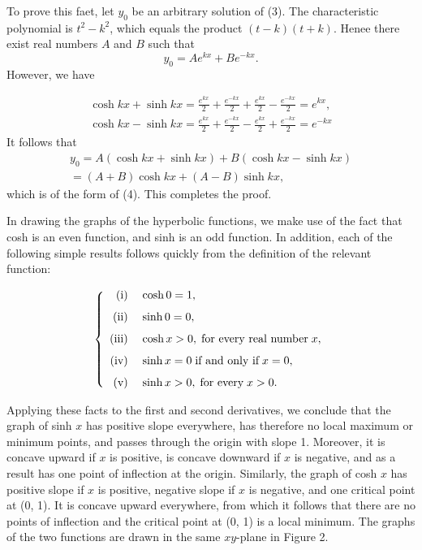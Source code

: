 To prove this faet, let $y_0$ be an arbitrary solution of (3). The characteristic polynomial is $t^2 - k^2$, which equals the product $(t - k)(t + k)$. Henee there exist real numbers $A$ and $B$ such that
$$
       y_0 = Ae^{kx} + Be^{-kx} .
$$
However, we have

\begin{eqnarray*}
       \cosh kx + \sinh kx = \frac{e^{kx}}{2} + \frac{e^{-kx}}{2} + \frac{e^{kx}}{2} - \frac{e^{-kx}}{2} = e^{kx}, \\
       \cosh kx - \sinh kx = \frac{e^{kx}}{2} + \frac{e^{-kx}}{2} - \frac{e^{kx}}{2} + \frac{e^{-kx}}{2} = e^{-kx}
\end{eqnarray*}
It follows that
\begin{eqnarray*}
       y_0 = A(\cosh kx + \sinh kx) + B(\cosh kx - \sinh kx) \\
       = (A + B) \cosh kx + (A - B) \sinh kx,
\end{eqnarray*}
which is of the form of (4). This completes the proof.

In drawing the graphs of the hyperbolic functions, we make use of the fact that cosh is an even function, and sinh is an odd function. In addition, each of the following simple results follows quickly from the definition of the relevant function:

\begin{theorem}
       $$
              \left \{ \begin{array}{rl}
                     \mathrm{(i)}\;   & \cosh 0 = 1, \vspace{.1in}                                     \\
                     \mathrm{(ii)}\;  & \sinh0 = 0, \vspace{.1in}                                      \\
                     \mathrm{(iii)}\; & \cosh x > 0, \;\mbox{for every real number}\; x, \vspace{.1in} \\
                     \mathrm{(iv)}\;  & \sinh x = 0 \;\mbox{if and only if}\; x = 0, \vspace{.1in}     \\
                     \mathrm{(v)}\;   & \sinh x > 0, \;\mbox{for every}\; x > 0.
              \end{array}
              \right .
       $$
\end{theorem}
Applying these facts to the first and second derivatives, we conclude that the graph of sinh $x$ has positive slope everywhere, has therefore no local maximum or minimum points, and passes through the origin with slope 1. Moreover, it is concave upward if $x$ is positive, is concave downward if $x$ is negative, and as a result has one point of inflection at the origin. Similarly, the graph of cosh $x$ has positive slope if $x$ is positive, negative slope if $x$ is negative, and one critical point at (0, 1). It is concave upward everywhere, from which it follows that there are no points of inflection and the critical point at (0, 1) is a local minimum. The graphs of the two functions are drawn in the same $xy$-plane in Figure 2.

